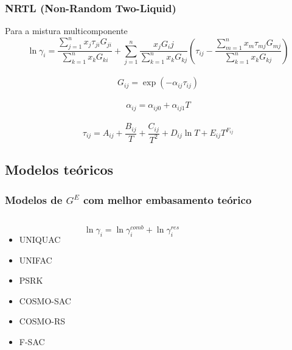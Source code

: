\documentclass[aspectratio=169]{beamer}
\begin{document}
\begin{frame}
	\frametitle{NRTL (Non-Random Two-Liquid)}
	Para a mistura multicomponente
		\begin{equation*}
			\ln{\gamma_i} = \frac{\sum_{j=1}^n{x_j \tau_{ji} G_{ji} }}
				{\sum_{k=1}^n{x_k G_{ki} }} +
			\sum_{j=1}^n\frac{x_j G_ij}{\sum_{k=1}^n x_k G_{kj}}
			\left ( \tau_{ij}- \frac{\sum_{m=1}^n x_m \tau_{mj} G_{mj} }
			{\sum_{k=1}^n{x_k G_{kj} }} \right )
		\end{equation*}
		\\
		\begin{equation*}
			G_{ij} = \exp \left ( -\alpha_{ij}\tau_{ij} \right )
		\end{equation*}
		\\
		\begin{equation*}
			\alpha_{ij} = \alpha_{ij0} + \alpha_{ij1}T
		\end{equation*}
		\\
		\begin{equation*}
			\tau_{ij} = A_{ij} + \frac{B_{ij}}{T} + \frac{C_{ij}}{T^2} +D_{ij}\ln T
			+E_{ij}T^{F_{ij}}
		\end{equation*}
\end{frame}

\subsection*{Modelos teóricos}

\begin{frame}
	\frametitle{Modelos de $G^E$ com melhor embasamento teórico}
	\begin{columns}[c]
		\begin{itemize}
		  	\item UNIQUAC
			\item UNIFAC
			\item PSRK
			\item COSMO-SAC
			\item COSMO-RS
			\item F-SAC
		\end{itemize}
		\pause
		\begin{block}{}
			\begin{equation*}
				\ln{\gamma_i} = \ln{\gamma_i^{comb}} + \ln{\gamma_i^{res}}
			\end{equation*}
		\end{block}
			
	\end{columns}
	
\end{frame}
\end{document}
